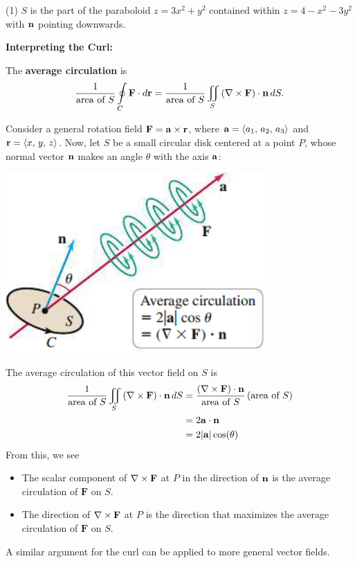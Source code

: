 \documentclass[../mathNotesPreamble]{subfiles}
\begin{document}
  \begin{tasks}[after-item-skip=\stretch{1}, label=\textbullet, item-indent=0pt, resume](1)
    \task $S$ is the part of the paraboloid $z=3x^2+y^2$ contained within $z=4-x^2-3y^2$ with ${\mathbf{n}}$ pointing downwards.
  \end{tasks}
  \pagebreak

  \textbf{Interpreting the Curl:}

  The \textbf{average circulation} is 
    \[\frac{1}{\textnormal{area of }S}\oint\limits_C \mathbf F\cdot d{\mathbf{r}}=\frac{1}{\textnormal{area of }S}\iint\limits_S {\left(\nabla\times\mathbf F\right)}\cdot{\mathbf{n}}\,dS.\]

  Consider a general rotation field $\mathbf F={\mathbf{a}}\times{\mathbf{r}}$, where ${\mathbf{a}}={\left\langle a_1,\,a_2,\,a_3 \right\rangle}$ and ${\mathbf{r}}={\left\langle x,\,y,\,z \right\rangle}$. Now, let $S$ be a small circular disk centered at a point $P$, whose normal vector ${\mathbf{n}}$ makes an angle $\theta$ with the axis ${\mathbf{a}}$:
  \begin{center}
    \includegraphics[width=0.4\linewidth]{../images/briggs_17_07/fig17_64}
  \end{center}
  The average circulation of this vector field on $S$ is
  \begin{align*}
    \frac{1}{\textnormal{area of }S} \iint\limits_S {\left(\nabla\times\mathbf F\right)}\cdot{\mathbf{n}}\,dS
      &=\frac{{\left(\nabla\times\mathbf F\right)}\cdot{\mathbf{n}}}{\textnormal{area of }S} \,{\left(\textnormal{area of }S\right)}\\
      &=2{\mathbf{a}}\cdot{\mathbf{n}}\\
      &=2{\left\vert{\mathbf{a}}\right\vert}\cos(\theta)
  \end{align*}
  From this, we see
  \begin{itemize}
    \item The scalar component of $\nabla\times\mathbf F$ at $P$ in the direction of ${\mathbf{n}}$ is the average circulation of $\mathbf F$ on $S$.
    \item The direction of $\nabla\times\mathbf F$ at $P$ is the direction that maximizes the average circulation of $\mathbf F$ on $S$.
  \end{itemize}
  A similar argument for the curl can be applied to more general vector fields.
  \pagebreak
\end{document}
